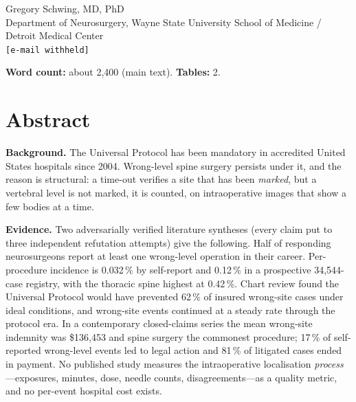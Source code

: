 \documentclass[11pt,letterpaper]{article}
\begin{document}

\bigskip
\noindent Gregory Schwing, MD, PhD\\
Department of Neurosurgery, Wayne State University School of Medicine / Detroit Medical Center\\
\texttt{[e-mail withheld]}

\bigskip
\noindent\textbf{Word count:} about 2,400 (main text). \textbf{Tables:} 2.

\section*{Abstract}
\noindent\textbf{Background.} The Universal Protocol has been mandatory in accredited United States
hospitals since 2004. Wrong-level spine surgery persists under it, and the reason is structural: a
time-out verifies a site that has been \emph{marked}, but a vertebral level is not marked, it is counted,
on intraoperative images that show a few bodies at a time.

\noindent\textbf{Evidence.} Two adversarially verified literature syntheses (every claim put to three
independent refutation attempts) give the following. Half of responding neurosurgeons report at least one
wrong-level operation in their career. Per-procedure incidence is 0.032\,\% by self-report and 0.12\,\% in
a prospective 34,544-case registry, with the thoracic spine highest at 0.42\,\%. Chart review found the
Universal Protocol would have prevented 62\,\% of insured wrong-site cases under ideal conditions, and
wrong-site events continued at a steady rate through the protocol era. In a contemporary closed-claims
series the mean wrong-site indemnity was \$136,453 and spine surgery the commonest procedure; 17\,\% of
self-reported wrong-level events led to legal action and 81\,\% of litigated cases ended in payment. No
published study measures the intraoperative localisation \emph{process}---exposures, minutes, dose, needle
counts, disagreements---as a quality metric, and no per-event hospital cost exists.
\end{document}
